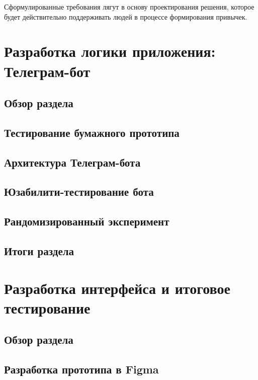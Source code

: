 \documentclass[pdflatex,sn-mathphys-num]{sn-jnl}%
\theoremstyle{thmstyleone}%
\theoremstyle{thmstyletwo}%
\theoremstyle{thmstylethree}%
\begin{document}
Сформулированные требования лягут в основу проектирования решения, которое будет действительно поддерживать людей в процессе формирования привычек.

\newpage

\section{Разработка логики приложения: Телеграм-бот}\label{Development}

\subsection{Обзор раздела}

\subsection{Тестирование бумажного прототипа}

\subsection{Архитектура Телеграм-бота}

\subsection{Юзабилити-тестирование бота}

\subsection{Рандомизированный эксперимент}

\subsection{Итоги раздела}

\section{Разработка интерфейса и итоговое тестирование}

\subsection{Обзор раздела}

\subsection{Разработка прототипа в Figma}
\end{document}
